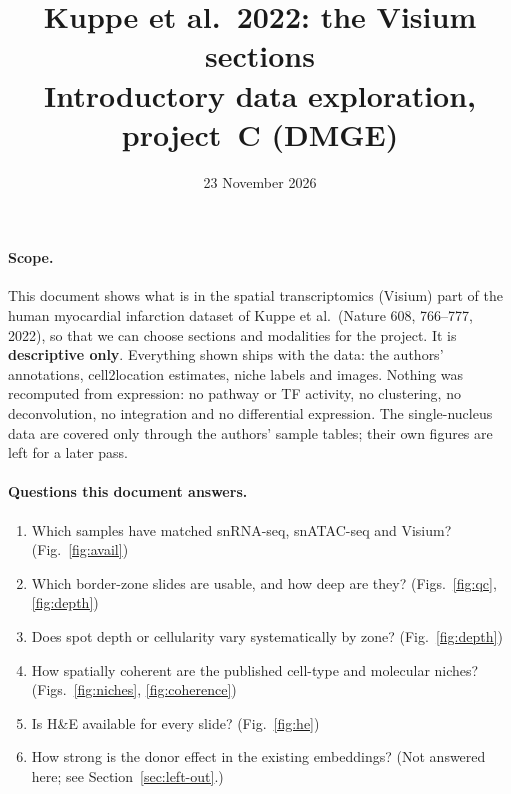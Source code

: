 \documentclass[11pt,a4paper]{article}
\title{Kuppe et al.\ 2022: the Visium sections\\[4pt]\large Introductory data exploration, project~C (DMGE)}
\author{}
\date{23 November 2026}
\begin{document}
\maketitle

\paragraph{Scope.} This document shows what is in the spatial transcriptomics (Visium) part of the human myocardial infarction dataset of Kuppe et al.\ (Nature 608, 766--777, 2022), so that we can choose sections and modalities for the project. It is \textbf{descriptive only}. Everything shown ships with the data: the authors' annotations, cell2location estimates, niche labels and images. Nothing was recomputed from expression: no pathway or TF activity, no clustering, no deconvolution, no integration and no differential expression. The single-nucleus data are covered only through the authors' sample tables; their own figures are left for a later pass.

\paragraph{Questions this document answers.}
\begin{enumerate}
\item Which samples have matched snRNA-seq, snATAC-seq and Visium? (Fig.~\ref{fig:avail})
\item Which border-zone slides are usable, and how deep are they? (Figs.~\ref{fig:qc}, \ref{fig:depth})
\item Does spot depth or cellularity vary systematically by zone? (Fig.~\ref{fig:depth})
\item How spatially coherent are the published cell-type and molecular niches? (Figs.~\ref{fig:niches}, \ref{fig:coherence})
\item Is H\&E available for every slide? (Fig.~\ref{fig:he})
\item How strong is the donor effect in the existing embeddings? (Not answered here; see Section~\ref{sec:left-out}.)
\end{enumerate}
\end{document}
